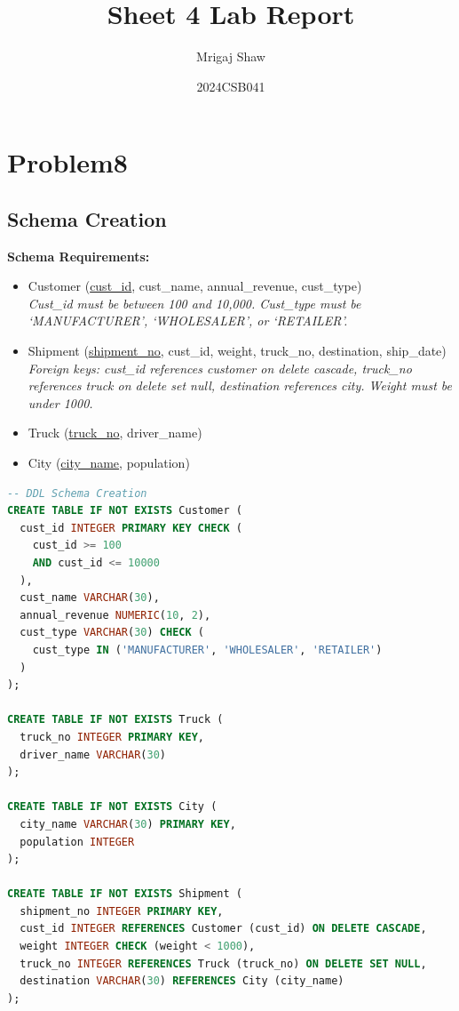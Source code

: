 \documentclass[11pt, a4paper]{article}
\title{Sheet 4 Lab Report}
\author{Mrigaj Shaw}
\date{2024CSB041}
\begin{document}
\maketitle

\section{Problem8}

\subsection*{Schema Creation}
\textbf{Schema Requirements:}
\begin{itemize}
    \item Customer (\underline{cust\_id}, cust\_name, annual\_revenue, cust\_type) \\
    \textit{Cust\_id must be between 100 and 10,000. Cust\_type must be `MANUFACTURER', `WHOLESALER', or `RETAILER'.}
    \item Shipment (\underline{shipment\_no}, cust\_id, weight, truck\_no, destination, ship\_date) \\
    \textit{Foreign keys: cust\_id references customer on delete cascade, truck\_no references truck on delete set null, destination references city. Weight must be under 1000.}
    \item Truck (\underline{truck\_no}, driver\_name)
    \item City (\underline{city\_name}, population)
\end{itemize}

\begin{lstlisting}[language=SQL]
-- DDL Schema Creation
CREATE TABLE IF NOT EXISTS Customer (
  cust_id INTEGER PRIMARY KEY CHECK (
    cust_id >= 100
    AND cust_id <= 10000
  ),
  cust_name VARCHAR(30),
  annual_revenue NUMERIC(10, 2),
  cust_type VARCHAR(30) CHECK (
    cust_type IN ('MANUFACTURER', 'WHOLESALER', 'RETAILER')
  )
);

CREATE TABLE IF NOT EXISTS Truck (
  truck_no INTEGER PRIMARY KEY,
  driver_name VARCHAR(30)
);

CREATE TABLE IF NOT EXISTS City (
  city_name VARCHAR(30) PRIMARY KEY,
  population INTEGER
);

CREATE TABLE IF NOT EXISTS Shipment (
  shipment_no INTEGER PRIMARY KEY,
  cust_id INTEGER REFERENCES Customer (cust_id) ON DELETE CASCADE,
  weight INTEGER CHECK (weight < 1000),
  truck_no INTEGER REFERENCES Truck (truck_no) ON DELETE SET NULL,
  destination VARCHAR(30) REFERENCES City (city_name)
);
\end{lstlisting}
\newpage
\end{document}
